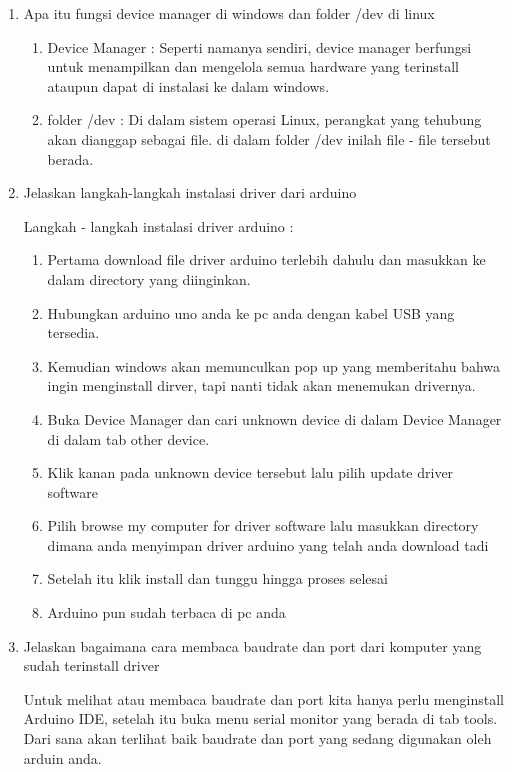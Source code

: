 \begin{enumerate}
	\item Apa itu fungsi device manager di windows dan folder /dev di linux
	\par
		\begin{enumerate}
		    \item Device Manager : Seperti namanya sendiri, device manager berfungsi untuk menampilkan dan mengelola semua hardware yang terinstall ataupun dapat di instalasi ke dalam windows.

			\item folder /dev : Di dalam sistem operasi Linux, perangkat yang tehubung akan dianggap sebagai file. di dalam folder /dev inilah file - file  tersebut berada.
		\end{enumerate}
	
	\item Jelaskan langkah-langkah instalasi driver dari arduino
	\par
		Langkah - langkah instalasi driver arduino :
		\begin{enumerate}
			\item Pertama download file driver arduino terlebih dahulu dan masukkan ke dalam directory yang diinginkan.
			\item Hubungkan arduino uno anda ke pc anda dengan kabel USB yang tersedia.
			\item Kemudian windows akan memunculkan pop up yang memberitahu bahwa ingin menginstall dirver, tapi nanti tidak akan menemukan drivernya.
			\item Buka Device Manager dan cari unknown device di dalam Device Manager di dalam tab other device.
			\item Klik kanan pada unknown device tersebut lalu pilih update driver software
			\item Pilih browse my computer for driver software lalu masukkan directory dimana anda menyimpan driver arduino yang telah anda download tadi
			\item Setelah itu klik install dan tunggu hingga proses selesai
			\item Arduino pun sudah terbaca di pc anda 
		\end{enumerate}
	
	\item Jelaskan bagaimana cara membaca baudrate dan port dari komputer yang sudah terinstall driver
	\par
	Untuk melihat atau membaca baudrate dan port kita hanya perlu menginstall Arduino IDE, setelah itu buka menu serial monitor yang berada di tab tools. Dari sana akan terlihat baik baudrate dan port yang sedang digunakan oleh arduin anda.
	

\end{enumerate}
